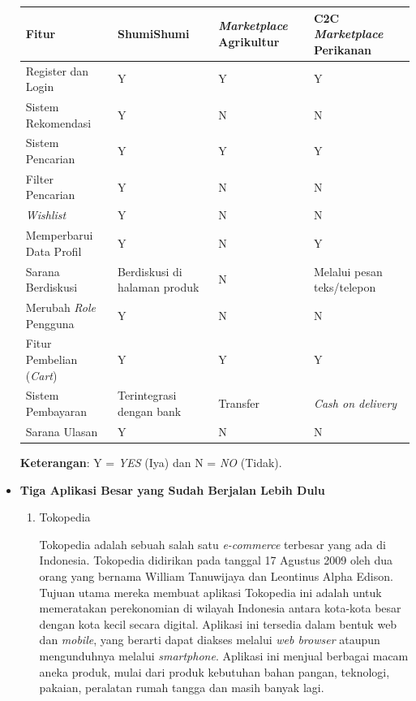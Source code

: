 \documentclass[a4paper]{article}
\begin{document}
\begin{itemize}
    \begin{centering}
    \begin{longtable}{|p{3cm}|p{2cm}|p{3cm}|p{4cm}|}
        \hline
        Fitur & ShumiShumi & \textit{Marketplace} Agrikultur & C2C \textit{Marketplace} Perikanan\\
        \hline
        Register dan Login & Y & Y & Y\\
        \hline
        Sistem Rekomendasi & Y & N & N\\
        \hline
        Sistem Pencarian & Y & Y & Y\\
        \hline
        Filter Pencarian & Y & N & N\\
        \hline
        \textit{Wishlist} & Y & N & N\\
        \hline
        Memperbarui Data Profil & Y & N & Y\\
        \hline
        Sarana Berdiskusi & Berdiskusi di halaman produk & N & Melalui pesan teks/telepon\\
        \hline
        Merubah \textit{Role} Pengguna & Y & N & N\\
        \hline
        Fitur Pembelian (\textit{Cart}) & Y & Y & Y\\
        \hline
        Sistem Pembayaran & Terintegrasi dengan bank & Transfer & \textit{Cash on delivery}\\
        \hline
        Sarana Ulasan & Y & N & N\\
        \hline
    \end{longtable}
    \end{centering}

    \textbf{Keterangan}: Y = \textit{YES} (Iya) dan N = \textit{NO} (Tidak).

    \newpage
    \item \textbf{Tiga Aplikasi Besar yang Sudah Berjalan Lebih Dulu}
    
    \begin{enumerate}
        \item Tokopedia
        
        Tokopedia adalah sebuah salah satu \textit{e-commerce} terbesar yang ada di Indonesia. Tokopedia didirikan pada tanggal 17 Agustus 2009 oleh dua orang yang bernama William Tanuwijaya dan Leontinus Alpha Edison. Tujuan utama mereka membuat aplikasi Tokopedia ini adalah untuk memeratakan perekonomian di wilayah Indonesia antara kota-kota besar dengan kota kecil secara digital. Aplikasi ini tersedia dalam bentuk web dan \textit{mobile}, yang berarti dapat diakses melalui \textit{web browser} ataupun mengunduhnya melalui \textit{smartphone}\autocite{about-tokped}. Aplikasi ini menjual berbagai macam aneka produk, mulai dari produk kebutuhan bahan pangan, teknologi, pakaian, peralatan rumah tangga dan masih banyak lagi.


\end{enumerate}
\end{itemize}
\end{document}
